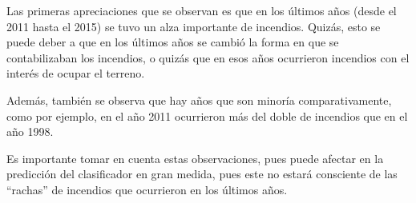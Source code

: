 Las primeras apreciaciones que se observan es que en los últimos años (desde el 2011 hasta el 2015) se tuvo un alza importante de incendios. Quizás, esto se puede deber a que en los últimos años se cambió la forma en que se contabilizaban los incendios, o quizás que en esos años ocurrieron incendios con el interés de ocupar el terreno.

Además, también se observa que hay años que son minoría comparativamente, como por ejemplo, en el año 2011 ocurrieron más del doble de incendios que en el año 1998. 

Es importante tomar en cuenta estas observaciones, pues puede afectar en la predicción del clasificador en gran medida, pues este no estará consciente de las ``rachas'' de incendios que ocurrieron en los últimos años.













